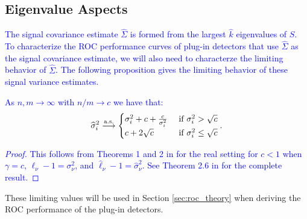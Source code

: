 \subsection{Eigenvalue Aspects}

\textcolor{blue}{The signal covariance estimate $\widehat{\Sigma}$ is formed from the largest $\widehat{k}$ eigenvalues of $S$. To characterize the ROC performance curves of plug-in detectors that use $\widehat{\Sigma}$ as the signal covariance estimate, we will also need to characterze the limiting behavior of $\widehat{\Sigma}$.  The following proposition gives the limiting behavior of these signal variance estimates.
\begin{prop}\label{th:eigvals_rmt}
As $n,m \longrightarrow \infty$ with $n/m \to c$ we have that:
\begin{equation*}
\widehat{\sigma}_i^2\overset{\textrm{a.s.}}{\longrightarrow}
\begin{cases}
 \sigma_i^2 + c + \frac{c}{\sigma_i^2} & \text{ if } \sigma_i^2 > \sqrt{c}\\
 c + 2\sqrt{c} & \text{ if } \sigma_i^2 \leq \sqrt{c}
\end{cases}.
\end{equation*}
\end{prop}
\begin{proof}
This follows from Theorems 1 and 2 in \cite{paul2007asymptotics} for the real setting for $c<1$ when $\gamma=c$, $\ell_\nu-1=\sigma_\nu^2$, and $\widehat{\ell}_\nu -1 = \widehat{\sigma}_\nu^2$. See Theorem 2.6 in \cite{benaych2011singular} for the complete result.
\end{proof}}
These limiting values will be used in Section \ref{sec:roc_theory} when deriving the ROC performance of the plug-in detectors.

